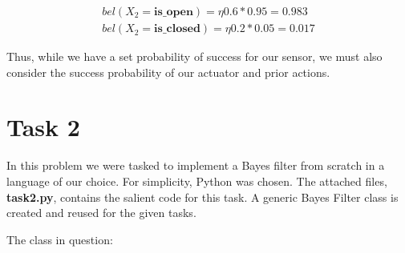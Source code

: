 \documentclass{article}
\begin{document}
\begin{equation}
    \begin{split}
        bel(X_2 = \textbf{is\_open}) = \eta 0.6 * 0.95 = 0.983 \\
        bel(X_2 = \textbf{is\_closed}) = \eta 0.2 * 0.05 = 0.017
    \end{split}
\end{equation}

Thus, while we have a set probability of success for our sensor, we must also consider the success probability of our actuator and prior actions.

\section*{Task 2}

In this problem we were tasked to implement a Bayes filter from scratch in a language of our choice. For simplicity, Python was chosen. The attached files, \textbf{task2.py}, contains the salient code for this task. A generic Bayes Filter class is created and reused for the given tasks.

The class in question:
\end{document}
